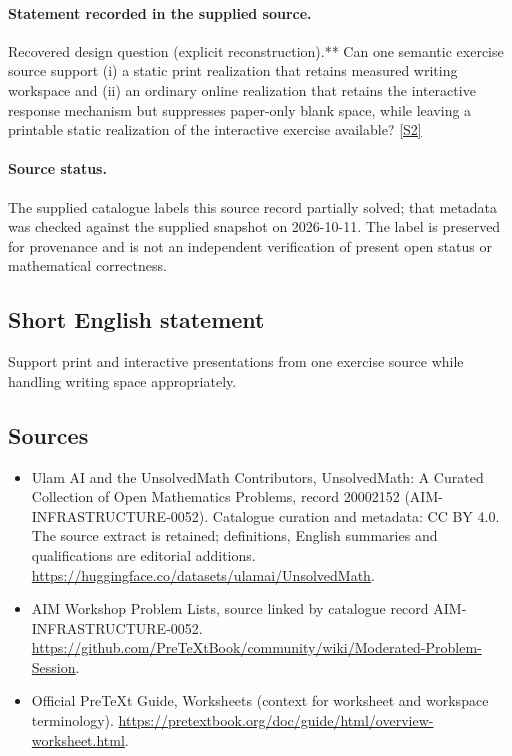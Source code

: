\documentclass[11pt]{article}
\newcommand{\sref}[2]{\hyperlink{source:#1:#2}{[S#2]}}
\begin{document}
\paragraph{Statement recorded in the supplied source.}
Recovered design question (explicit reconstruction).** Can one semantic exercise source support (i) a static print realization that retains measured writing workspace and (ii) an ordinary online realization that retains the interactive response mechanism but suppresses paper-only blank space, while leaving a printable static realization of the interactive exercise available? \sref{20002152}{2}
\paragraph{Source status.}
The supplied catalogue labels this source record partially solved; that metadata was checked against the supplied snapshot on 2026-10-11. The label is preserved for provenance and is not an independent verification of present open status or mathematical correctness.
\subsection{Short English statement}
Support print and interactive presentations from one exercise source while handling writing space appropriately.
\subsection{Sources}
\begin{itemize}
\item[\hypertarget{source:20002152:1}{S1}] Ulam AI and the UnsolvedMath Contributors, UnsolvedMath: A Curated Collection of Open Mathematics Problems, record 20002152 (AIM-INFRASTRUCTURE-0052). Catalogue curation and metadata: CC BY 4.0. The source extract is retained; definitions, English summaries and qualifications are editorial additions.
\url{https://huggingface.co/datasets/ulamai/UnsolvedMath}.
\item[\hypertarget{source:20002152:2}{S2}] AIM Workshop Problem Lists, source linked by catalogue record AIM-INFRASTRUCTURE-0052.
\url{https://github.com/PreTeXtBook/community/wiki/Moderated-Problem-Session}.
\item[\hypertarget{source:20002152:3}{S3}] Official PreTeXt Guide, Worksheets (context for worksheet and workspace terminology).
\url{https://pretextbook.org/doc/guide/html/overview-worksheet.html}.
\end{itemize}
\end{document}
